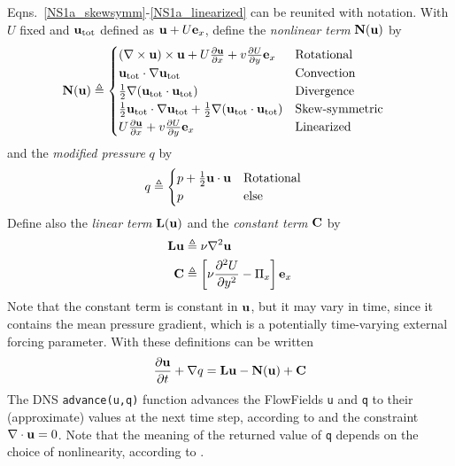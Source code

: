 \documentclass{article}[12pt]
\begin{document}
Eqns.\ \ref{NS1a_skewsymm}-\ref{NS1a_linearized} can be reunited with
notation. With $U$ fixed and ${\bf u}_{\text{tot}}$ defined as ${\bf u} + U {\bf e}_x$, define the
{\em nonlinear term} ${\bf N}({\bf u})$ by
\begin{align}
{\bf N}({\bf u}) &\triangleq
\begin{cases}
(\nabla \times {\bf u}) \times {\bf u} + U \frac{\partial {\bf u}}{\partial x} + v \frac{\partial U}{\partial y} {\bf e}_x
& \text{Rotational} \\
{\bf u}_{\text{tot}} \cdot {\bf \nabla} {\bf u}_{\text{tot}}  & \text{Convection} \\
\frac{1}{2} {\bf \nabla} ({\bf u}_{\text{tot}} \cdot {\bf u}_{\text{tot}})  & \text{Divergence} \\
\frac{1}{2} {\bf u}_{\text{tot}} \cdot {\bf \nabla} {\bf u}_{\text{tot}}  + \frac{1}{2} {\bf \nabla} ({\bf u}_{\text{tot}} \cdot {\bf u}_{\text{tot}})  & \text{Skew-symmetric} \\
U \frac{\partial {\bf u}}{\partial x} + v \frac{\partial U}{\partial y} {\bf e}_x & \text{Linearized} \label{N_defn}
\end{cases}
\end{align}
and the {\em modified pressure} $q$ by
\begin{align}
q &\triangleq
\begin{cases}
 p + \frac{1}{2} {\bf u} \cdot {\bf u} & \text{Rotational} \\
 p & \text{else} \\
\label{q_defn}
\end{cases}
\end{align}
Define also the {\em linear term} ${\bf L}({\bf u})$ and the
{\em constant term} ${\bf C}$ by
\begin{align}
{\bf L} {\bf u} &\triangleq \nu \nabla^2 {\bf u} \\
{\bf C} &\triangleq \left[ \nu  \frac{\partial^2 U}{\partial y^2} - \Pi_x \right] {\bf e}_x
\end{align}
Note that the constant term is constant in ${\bf u}$, but it may vary in
time, since it contains the mean pressure gradient, which is a
potentially time-varying external forcing parameter. With these
definitions  can be written
\begin{align}
\frac{\partial {\bf u}}{\partial t} + {\bf \nabla} q = {\bf L} {\bf u}  - {\bf N} ({\bf u}) + {\bf C} \label{NS2a}
\end{align}
The DNS {\tt advance(u,q)} function advances the FlowFields
{\tt u} and {\tt q} to their (approximate) values at the next time step,
according to  and the constraint ${\bf \nabla} \cdot{\bf u} = 0$. Note
that the meaning of the returned value of {\tt q} depends on the
choice of nonlinearity, according to .
\end{document}
